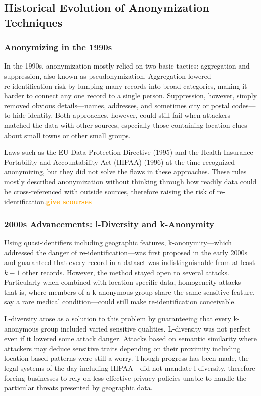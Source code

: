 \documentclass[twocolumn]{article}
\newcommand{\later}[1]{\textbf{\textcolor{orange}{#1}}}
\begin{document}
\subsection{Historical Evolution of Anonymization Techniques}

\subsubsection{Anonymizing in the 1990s}

In the 1990s, anonymization mostly relied on two basic tactics: aggregation and suppression, also known as pseudonymization. Aggregation lowered re‑identification risk by lumping many records into broad categories, making it harder to connect any one record to a single person. Suppression, however, simply removed obvious details—names, addresses, and sometimes city or postal codes—to hide identity. Both approaches, however, could still fail when attackers matched the data with other sources, especially those containing location clues about small towns or other small groups.

Laws such as the EU Data Protection Directive (1995) and the Health Insurance Portability and Accountability Act (HIPAA) (1996) at the time recognized anonymizing, but they did not solve the flaws in these approaches. These rules mostly described anonymization without thinking through how readily data could be cross-referenced with outside sources, therefore raising the risk of re-identification.\later{give scourses}

\subsubsection{2000s Advancements: l-Diversity and k-Anonymity}

Using quasi-identifiers including geographic features, k-anonymity—which addressed the danger of re-identification—was first proposed in the early 2000s and guaranteed that every record in a dataset was indistinguishable from at least \(k-1\) other records. However, the method stayed open to several attacks. Particularly when combined with location-specific data, homogeneity attacks—that is, where members of a k-anonymous group share the same sensitive feature, say a rare medical condition—could still make re-identification conceivable.

L-diversity arose as a solution to this problem by guaranteeing that every k-anonymous group included varied sensitive qualities. L-diversity was not perfect even if it lowered some attack danger. Attacks based on semantic similarity where attackers may deduce sensitive traits depending on their proximity including location-based patterns were still a worry. Though progress has been made, the legal systems of the day including HIPAA—did not mandate l-diversity, therefore forcing businesses to rely on less effective privacy policies unable to handle the particular threats presented by geographic data.
\end{document}
